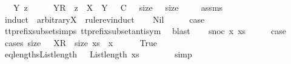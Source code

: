 \ \ \ {\isachardoublequoteopen}{\isasymexists}Y\ z\ {\isasymrho}\ {\isasymsigma}\ {\isacharequal}\ {\isasymrho}\ {\isacharat}\ {\isacharparenleft}{\isacharbrackleft}{\isacharbrackleft}Y{\isacharbrackright}\isactrlsub R{\isacharbrackright}\ {\isacharat}\ z{\isacharparenright}\ {\isasymand}\ X\ {\isasymsubseteq}\ Y\ {\isasymand}\ {\isasymrho}\ {\isasymlesssim}\isactrlsub C\ {\isasymrho}\ {\isasymand}\ size\ {\isasymrho}\ {\isacharequal}\ size\ {\isasymrho}{\isachardoublequoteclose}\isanewline
%
\isadelimproof
\ \ %
\endisadelimproof
%
\isatagproof
{}\isamarkupfalse%
\ assms\ \isamarkupfalse%
\ {\isacharparenleft}induct\ {\isasymsigma}\ arbitrary{\isacharcolon}X\ {\isasymrho}\ rule{\isacharcolon}rev{\isacharunderscore}induct{\isacharparenright}\isanewline
\ \ \isamarkupfalse%
\ Nil\isanewline
\ \ \isamarkupfalse%
\ \isamarkupfalse%
\ {\isacharquery}case\ \isamarkupfalse%
\ tt{\isacharunderscore}prefix{\isacharunderscore}subset{\isachardot}simps{\isacharparenleft}{}{\isacharparenright}\ tt{\isacharunderscore}prefix{\isacharunderscore}subset{\isacharunderscore}antisym\ \isamarkupfalse%
\ blast\isanewline
{}\isamarkupfalse%
\isanewline
\ \ \isamarkupfalse%
\ {\isacharparenleft}snoc\ x\ xs{\isacharparenright}\isanewline
\ \ \isamarkupfalse%
\ \isamarkupfalse%
\ {\isacharquery}case\isanewline
\ \ \isamarkupfalse%
\ {\isacharparenleft}cases\ {\isachardoublequoteopen}size\ {\isacharparenleft}{\isasymrho}\ {\isacharat}\ {\isacharbrackleft}{\isacharbrackleft}X{\isacharbrackright}\isactrlsub R{\isacharbrackright}{\isacharparenright}\ {\isacharequal}\ size\ {\isacharparenleft}xs\ {\isacharat}\ {\isacharbrackleft}x{\isacharbrackright}{\isacharparenright}{\isachardoublequoteclose}{\isacharparenright}\isanewline
\ \ \ \ \isamarkupfalse%
\ True\isanewline
\ \ \ \ \isamarkupfalse%
\ \isamarkupfalse%
\ eq{\isacharunderscore}lengths{\isacharcolon}{\isachardoublequoteopen}List{\isachardot}length\ {\isacharparenleft}{\isasymrho}{\isacharparenright}\ {\isacharequal}\ List{\isachardot}length\ {\isacharparenleft}xs{\isacharparenright}{\isachardoublequoteclose}\isanewline
\ \ \ \ \ \ \isamarkupfalse%
\ simp\isanewline
\ \ \ \ \isamarkupfalse%
\ \isamarkupfalse%
